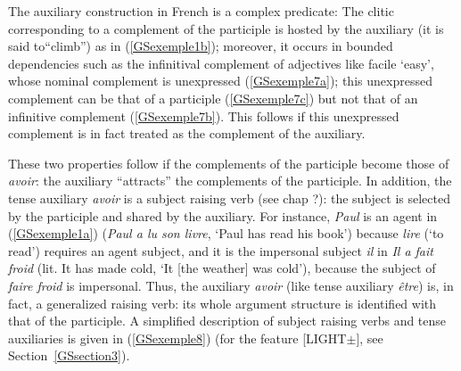 \documentclass[output=paper
                ,modfonts
                ,nonflat
	        ,collection
	        ,collectionchapter
	        ,collectiontoclongg
 	        ,biblatex
                ,babelshorthands
                ,newtxmath
                ,draftmode
                ,colorlinks, citecolor=brown
]{./langsci/langscibook}
\begin{document}
{The auxiliary construction in French is a complex predicate: The clitic corresponding to a complement of the participle is hosted by the auxiliary (it is said to``climb'') as in (\ref{GSexemple1b}); moreover, it occurs in bounded dependencies such as the infinitival complement of adjectives like facile `easy', whose nominal complement is unexpressed (\ref{GSexemple7a}); this unexpressed complement can be that of a participle (\ref{GSexemple7c}) but not that of an infinitive complement (\ref{GSexemple7b}). This follows if this unexpressed complement is in fact treated as the complement of the auxiliary.


\begin{exe}
	\ex \label{GSexemple7}
	\begin{xlist}
		
		 \label{GSexemple7a}
		
		 \label{GSexemple7b}
		
		 \label{GSexemple7c}
		

	\end{xlist}
\end{exe}

These two properties follow if the complements of the participle become those of \textit{avoir}: the auxiliary ``attracts'' the complements of the participle. In addition, the tense auxiliary \textit{avoir} is a subject raising verb (see chap ?): the subject is selected by the participle and shared by the auxiliary. For instance, \textit{Paul} is an agent in (\ref{GSexemple1a}) (\textit{Paul a lu son livre}, `Paul has read his book') because \textit{lire} (`to read') requires an agent subject, and it is the impersonal subject \textit{il} in \textit{Il a fait froid} (lit. It has made cold, `It [the weather] was cold'), because the subject of \textit{faire froid} is impersonal. Thus, the auxiliary \textit{avoir} (like tense auxiliary \textit{\^etre}) is, in fact, a generalized raising verb: its whole argument structure is identified with that of the participle. A simplified description of subject raising verbs and tense auxiliaries is given in (\ref{GSexemple8}) (for the feature [LIGHT$\pm$], see Section~\ref{GSsection3}).

}
\end{document}
